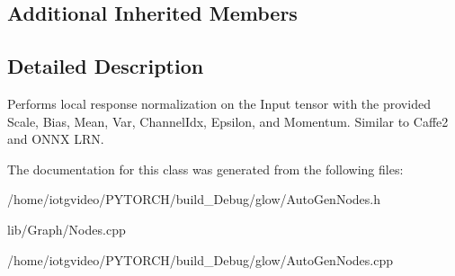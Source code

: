 \subsection*{Additional Inherited Members}


\subsection{Detailed Description}
Performs local response normalization on the Input tensor with the provided Scale, Bias, Mean, Var, Channel\+Idx, Epsilon, and Momentum. Similar to Caffe2 and O\+N\+NX L\+RN. 

The documentation for this class was generated from the following files\+:\begin{DoxyCompactItemize}
\item 
/home/iotgvideo/\+P\+Y\+T\+O\+R\+C\+H/build\+\_\+\+Debug/glow/Auto\+Gen\+Nodes.\+h\item 
lib/\+Graph/Nodes.\+cpp\item 
/home/iotgvideo/\+P\+Y\+T\+O\+R\+C\+H/build\+\_\+\+Debug/glow/Auto\+Gen\+Nodes.\+cpp\end{DoxyCompactItemize}
